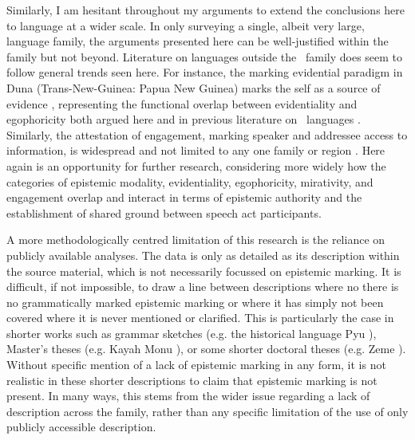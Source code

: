 Similarly, I am hesitant throughout my arguments to extend the conclusions here to language at a wider scale. In only surveying a single, albeit very large, language family, the arguments presented here can be well-justified within the family but not beyond. Literature on languages outside the \lfam\ family does seem to follow general trends seen here. For instance, the marking evidential paradigm in Duna (Trans-New-Guinea: Papua New Guinea) marks the self as a source of evidence \cite{SanRoque2012}, representing the functional overlap between evidentiality and egophoricity both argued here and in previous literature on \lfam\ languages \cites{Gawne2017}{Hill2020}. Similarly, the attestation of engagement, marking speaker and addressee access to information, is widespread and not limited to any one family or region \cite{EvansBergqvistSanRoque2018a}. Here again is an opportunity for further research, considering more widely how the categories of epistemic modality, evidentiality, egophoricity, mirativity, and engagement overlap and interact in terms of epistemic authority and the establishment of shared ground between speech act participants.

A more methodologically centred limitation of this research is the reliance on publicly available analyses. The data is only as detailed as its description within the source material, which is not necessarily focussed on epistemic marking. It is difficult, if not impossible, to draw a line between descriptions where no there is no grammatically marked epistemic marking or where it has simply not been covered where it is never mentioned or clarified. This is particularly the case in shorter works such as grammar sketches (e.g. the historical language Pyu \cite[Subfamily Unclear: Myanmar][]{Miyake2019}), Master's theses (e.g. Kayah Monu \cite[Karenic: Myanmar][]{Aung2013}), or some shorter doctoral theses (e.g. Zeme \cite[Zeme subfamily: India][]{Chanu2017}). Without specific mention of a lack of epistemic marking in any form, it is not realistic in these shorter descriptions to claim that epistemic marking is not present. In many ways, this stems from the wider issue regarding a lack of description across the family, rather than any specific limitation of the use of only publicly accessible description.

